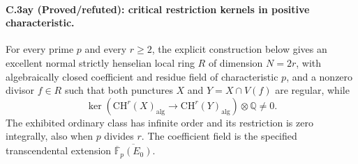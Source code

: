 \paragraph{C.3ay (Proved/refuted): critical restriction kernels in positive characteristic.}
For every prime $p$ and every $r\ge2$, the explicit construction below
gives an excellent normal strictly henselian local ring $R$ of dimension
$N=2r$, with algebraically closed coefficient and residue field of
characteristic $p$, and a nonzero divisor $f\in R$ such that both
punctures $X$ and $Y=X\cap V(f)$ are regular, while
\[
 \ker\!\left(\mathrm{CH}^r(X)_{\mathrm{alg}}
       \longrightarrow\mathrm{CH}^r(Y)_{\mathrm{alg}}\right)
                 \otimes\mathbb Q\ne0.
\]
The exhibited ordinary class has infinite order and its restriction is
zero integrally, also when $p$ divides $r$. The coefficient field is
the specified transcendental extension
$\overline{\overline{\mathbb F}_p(E_0)}$.

